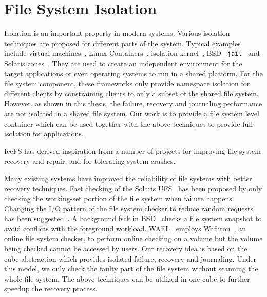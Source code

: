 \section{File System Isolation}

Isolation is an important property in modern systems. 
Various isolation techniques are proposed for different parts of the 
system.  Typical examples include virtual
machines~\cite{bugnion97disco,DragovicEtAl03-Xen}, Linux Containers~\cite{linux-container}, 
isolation kernel~\cite{WhitakerEtAl02-Denali}, BSD {\tt
  jail}~\cite{Poul+00-Jail} and Solaris zones~\cite{Solaris11-Zones}.  
They are used to create an independent environment for the target
applications or even operating systems to run in a shared platform.  
For the file system component, these frameworks only provide namespace
isolation for different clients by constraining clients to only a
subset of the shared file system.  However, as shown in this thesis,
the failure, recovery and journaling performance are not isolated in
a shared file system.  Our work is to provide a file system level
container which can be used together with the above techniques to
provide full isolation for applications.

IceFS has derived inspiration from a number of projects for improving
file system recovery and repair, and for tolerating system crashes.

Many existing systems have improved the reliability of file systems
with better recovery techniques.  Fast checking of the Solaris UFS~\cite{PeacockEtAl98-SolarisFsck} has been proposed by only
checking the working-set portion of the file system when failure
happens.  Changing the I/O pattern of the file system checker to reduce
random requests has been suggested~\cite{BinaEmrath89-FasterFsck,Ma+13-ffsck}.
A background fsck in BSD~\cite{McKusick02-BackgroundFsck} checks a file system 
snapshot to avoid conflicts with the foreground
workload. WAFL~\cite{HitzEtAl94-WAFL} employs Wafliron~\cite{WAFL-Iron}, an
online file system checker, to perform online checking on a volume but the
volume being checked cannot be accessed by users.  
Our recovery idea is based on the cube abstraction which provides isolated
failure, recovery and journaling.  Under this model, we only check the
faulty part of the file system without scanning the whole file system.
The above techniques can be utilized in one cube to further speedup
the recovery process.

